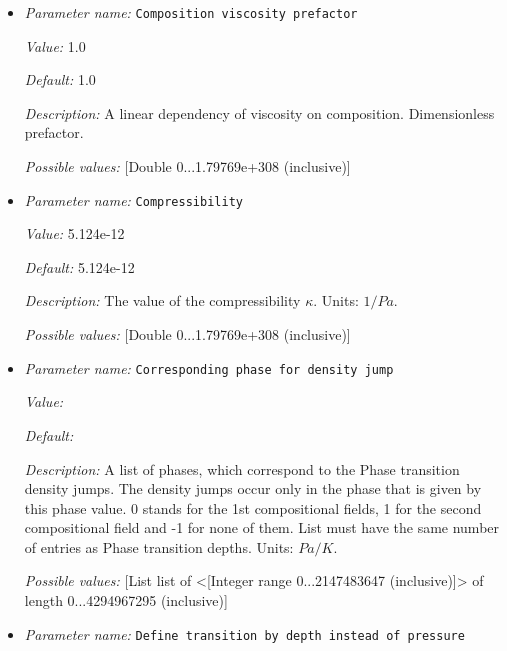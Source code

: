 \begin{itemize}
\item {\it Parameter name:} {\tt Composition viscosity prefactor}
\label{parameters:Material model/Latent heat/Composition viscosity prefactor}


{\it Value:} 1.0


{\it Default:} 1.0


{\it Description:} A linear dependency of viscosity on composition. Dimensionless prefactor.


{\it Possible values:} [Double 0...1.79769e+308 (inclusive)]
\item {\it Parameter name:} {\tt Compressibility}
\label{parameters:Material model/Latent heat/Compressibility}


{\it Value:} 5.124e-12


{\it Default:} 5.124e-12


{\it Description:} The value of the compressibility $\kappa$. Units: $1/Pa$.


{\it Possible values:} [Double 0...1.79769e+308 (inclusive)]
\item {\it Parameter name:} {\tt Corresponding phase for density jump}
\label{parameters:Material model/Latent heat/Corresponding phase for density jump}


{\it Value:} 


{\it Default:} 


{\it Description:} A list of phases, which correspond to the Phase transition density jumps. The density jumps occur only in the phase that is given by this phase value. 0 stands for the 1st compositional fields, 1 for the second compositional field and -1 for none of them. List must have the same number of entries as Phase transition depths. Units: $Pa/K$.


{\it Possible values:} [List list of <[Integer range 0...2147483647 (inclusive)]> of length 0...4294967295 (inclusive)]
\item {\it Parameter name:} {\tt Define transition by depth instead of pressure}
\label{parameters:Material model/Latent heat/Define transition by depth instead of pressure}



\end{itemize}
